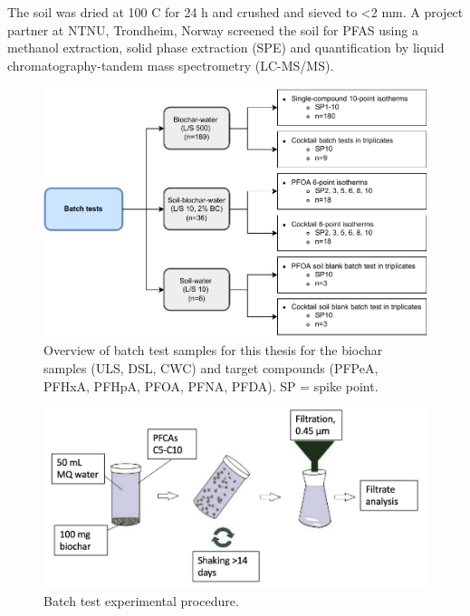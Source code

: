 The soil was dried at 100 \textdegree C for 24 h and crushed and sieved to \textless 2 mm.  A project partner at NTNU, Trondheim, Norway screened the soil for PFAS using a methanol extraction, solid phase extraction (SPE) and quantification by liquid chromatography-tandem mass spectrometry (LC-MS/MS). 

\begin{figure}
    \centering
    \includegraphics{Diagrams/Methods-Page-9.pdf}
    \caption{Overview of batch test samples for this thesis for the biochar samples (ULS, DSL, CWC) and target compounds (PFPeA, PFHxA, PFHpA, PFOA, PFNA, PFDA). SP = spike point.}
    \label{fig:batchtests_flowchart}
\end{figure}

\begin{figure}
    \centering
    \includegraphics[width=\textwidth]{Diagrams/Batch_test.png}
    \caption{Batch test experimental procedure.}
    \label{fig:batchtest_setup}
\end{figure}

